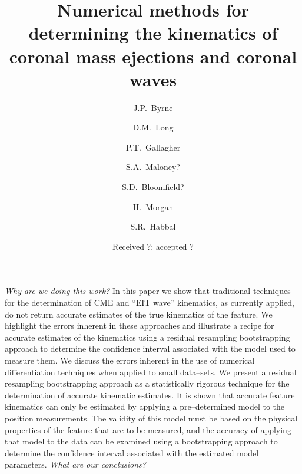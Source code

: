 \documentclass[structabstract]{aa}
\begin{document}
\title{Numerical methods for determining the kinematics of coronal mass ejections and coronal waves}


\author{J.P.~Byrne
	\and D.M.~Long
	\and P.T.~Gallagher
	\and S.A.~Maloney?
	\and S.D.~Bloomfield?
	\and H.~Morgan
	\and S.R.~Habbal}

\date{Received ?; accepted ?}
\abstract
{\emph{Why are we doing this work?} }
{In this paper we show that traditional techniques for the determination of CME and ``EIT wave'' kinematics, as currently applied, do not return accurate estimates of the true kinematics of the feature. We highlight the errors inherent in these approaches and illustrate a recipe for accurate estimates of the kinematics using a residual resampling bootstrapping approach to determine the confidence interval associated with the model used to measure them.}
{We discuss the errors inherent in the use of numerical differentiation techniques when applied to small data--sets. We present a residual resampling bootstrapping approach as a statistically rigorous technique for the determination of accurate kinematic estimates.}
{It is shown that accurate feature kinematics can only be estimated by applying a pre--determined model to the position measurements. The validity of this model must be based on the physical properties of the feature that are to be measured, and the accuracy of applying that model to the data can be examined using a bootstrapping approach to determine the confidence interval associated with the estimated model parameters.}
{\emph{What are our conclusions?}}


\end{document}
